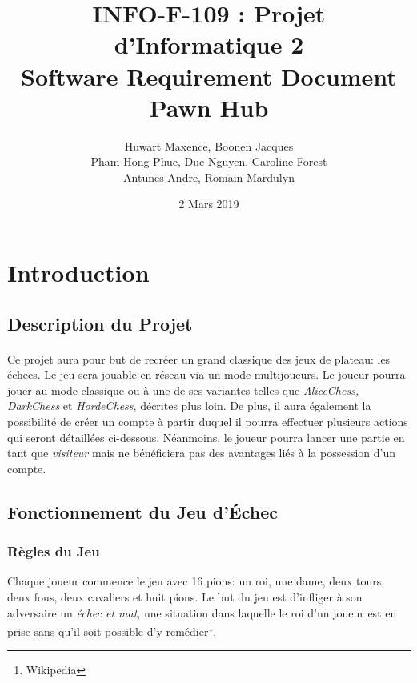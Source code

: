 \documentclass[10pt, a4paper]{article}
\title{\LARGE{INFO-F-109 : Projet d'Informatique 2 }\\
       \textbf{Software Requirement Document\\
	   Pawn Hub}}
\author{Huwart Maxence, Boonen Jacques\\
		Pham Hong Phuc, Duc Nguyen, Caroline Forest\\
		Antunes Andre, Romain Mardulyn}
\date{2 Mars 2019}
\begin{document}
	\maketitle
	\newpage
	\renewcommand{\contentsname}{Table des Matières}
	\tableofcontents %
	\newpage
	\section{Introduction}
		\subsection{Description du Projet}
			\paragraph{}Ce projet aura pour but de recréer un grand classique des jeux de plateau: les échecs. Le jeu sera jouable en réseau via un mode multijoueurs. Le joueur pourra jouer au mode classique ou à une de ses variantes telles que  {\itshape AliceChess, DarkChess} et {\itshape HordeChess}, décrites plus loin. De plus, il aura également la possibilité de créer un compte à partir duquel il pourra effectuer plusieurs actions qui seront détaillées ci-dessous. Néanmoins, le joueur pourra lancer une partie en tant que {\itshape visiteur} mais ne bénéficiera pas des avantages liés à la possession d'un compte.\\
			\subsection{Fonctionnement du Jeu d'Échec}
			\subsubsection{Règles du Jeu} 
			Chaque joueur commence le jeu avec 16 pions: un roi, une dame, deux tours, deux fous, deux cavaliers et huit pions. Le but du jeu est d'infliger à son adversaire un \textit{échec et mat}, une situation dans laquelle le roi d'un joueur est en prise sans qu'il soit possible d'y remédier\footnote{Wikipedia}.
\end{document}
